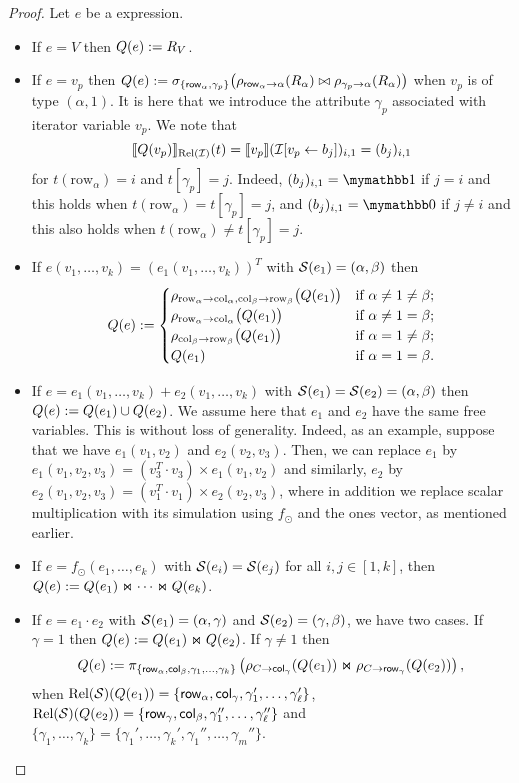\begin{proof}
Let $e$ be a \langsum expression.
\begin{itemize}
  \item If $e=V$ then $Q (e):=R_V$.
  \item If $e=v_p$ then $Q (e):=\sigma_{\lbrace \mathsf{row}_\alpha,\gamma_p\rbrace}\bigl(\rho_{\mathsf{row}_\alpha\to \alpha}(R_\alpha)\bowtie \rho_{\gamma_p\to \alpha}(R_\alpha)\bigr)$ when  $v_p$ is of type $(\alpha,1)$. It is here that we introduce the attribute $\gamma_p$ associated with iterator variable $v_p$.
 We note that 
$$ \llbracket Q(v_p) \rrbracket_{\text{Rel}(\mathcal{I})}(t)=\llbracket v_p \rrbracket(\mathcal{I}[v_p\gets b_{j}])_{i,1}=(b_j)_{i,1}
$$
for $t(\mathrm{row}_\alpha)=i$ and $t[\gamma_p]=j$. Indeed, $(b_j)_{i,1}=\kone$ if $j=i$
and this holds when $t(\mathrm{row}_\alpha)=t[\gamma_p]=j$, and $(b_j)_{i,1}=\kzero$ if $j\neq i$
and this also holds when $t(\mathrm{row}_\alpha)\neq t[\gamma_p]=j$.

  \item If $e(v_1,\ldots,v_k)=(e_1(v_1,\ldots,v_k))^T$ with $\mathcal{S} (e_1)=(\alpha, \beta)$ then \[
Q(e) :=
\begin{cases}
\rho_{\mathrm{row}_\alpha \to \mathrm{col}_\alpha,\mathrm{col}_\beta \to \mathrm{row}_\beta}\bigl(Q(e_1)\bigr) & \text{if } \alpha \neq 1 \neq \beta; \cr
\rho_{\mathrm{row}_\alpha \to \mathrm{col}_\alpha}\bigl(Q(e_1)\bigr) & \text{if } \alpha \neq 1 = \beta; \cr
\rho_{\mathrm{col}_\beta \to \mathrm{row}_\beta}\bigl(Q(e_1)\bigr) & \text{if } \alpha = 1 \neq \beta; \cr
Q(e_1) & \text{if } \alpha = 1 = \beta.
\end{cases}
\]
\item If $e=e_1(v_1,\ldots,v_k)+e_2(v_1,\ldots,v_k)$ with $\mathcal{S} (e_1)=\mathcal{S} (e_2)=(\alpha, \beta)$ then $Q (e):=Q (e_1)\cup Q (e_2)$. We assume here that $e_1$ and $e_2$ have the same free variables. This is without loss of generality. Indeed, as an example, suppose that we have $e_1(v_1,v_2)$
and $e_2(v_2,v_3)$. Then, we can replace $e_1$ by  $e_1(v_1,v_2,v_3)=(v_3^T\cdot v_3)\times e_1(v_1,v_2)$
and similarly, $e_2$ by $e_2(v_1,v_2,v_3)=(v_1^T\cdot v_1)\times e_2(v_2,v_3)$, where in addition we replace scalar multiplication with its simulation using $f_{\odot}$ and the ones vector, as mentioned earlier. 

  \item If $e=f_\odot(e_1,\ldots, e_k)$ with $\mathcal{S}(e_i)=\mathcal{S}(e_j)$ for all $i,j\in[1,k]$, then $Q(e):=Q(e_1)\Join \cdots \Join Q(e_k)$.

  \item If $e=e_1\cdot e_2$ with $\mathcal{S} (e_1)=(\alpha, \gamma)$ and $\mathcal{S} (e_2)=(\gamma, \beta)$, we have two cases. If $\gamma = 1$ then $Q (e):=Q (e_1)\Join Q (e_2)$.
If $\gamma\neq 1$ then
$$
Q (e) := \pi_{\lbrace \mathsf{row}_{\alpha},\mathsf{col}_{\beta}, \gamma_1,\ldots,\gamma_k \rbrace}\left(\rho_{C\to \mathsf{col}_\gamma}(Q (e_1))\Join \rho_{C\to \mathsf{row}_\gamma}(Q (e_2)) \right),
$$
when $\text{Rel}(\mathcal{S})(Q(e_1))=\{\mathsf{row}_\alpha,\mathsf{col}_\gamma,\gamma_1',\ldots,\gamma_{\ell}'\}$,
$\text{Rel}(\mathcal{S})(Q(e_2))=\{\mathsf{row}_\gamma,\mathsf{col}_\beta,\gamma_1'',\ldots,\gamma_{\ell}''\}$ and $\{\gamma_1,\ldots,\gamma_k\}=\{\gamma_1',\ldots,\gamma_k',\gamma_1'',\ldots,\gamma_m''\}$.


\end{itemize}
\end{proof}

